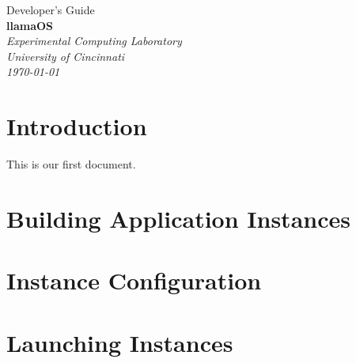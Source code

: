 \documentclass[draft]{article}
\begin{document}

\begin{titlepage}
\raggedleft
{\huge{Developer's Guide}\\[1.0in]}
{\Huge{\textbf{llamaOS}}\\[0.125in]}
{\Large{}}
\vfill
\itshape
Experimental Computing Laboratory\\
University of Cincinnati\\[0.125in]
\today
\end{titlepage}


\tableofcontents
\clearpage


\section{Introduction}
This is our first document.

\section{Building Application Instances}

\section{Instance Configuration}

\section{Launching Instances}
\end{document}
